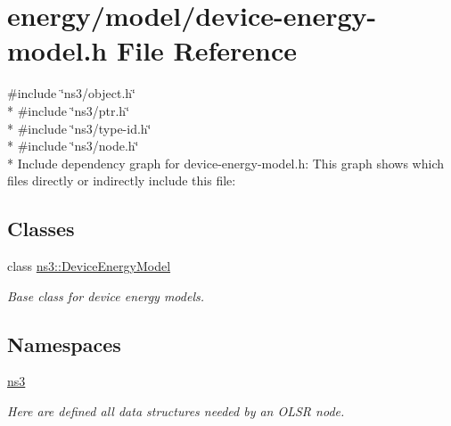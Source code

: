 \hypertarget{device-energy-model_8h}{}\section{energy/model/device-\/energy-\/model.h File Reference}
\label{device-energy-model_8h}
{\ttfamily \#include \char`\"{}ns3/object.\+h\char`\"{}}\\*
{\ttfamily \#include \char`\"{}ns3/ptr.\+h\char`\"{}}\\*
{\ttfamily \#include \char`\"{}ns3/type-\/id.\+h\char`\"{}}\\*
{\ttfamily \#include \char`\"{}ns3/node.\+h\char`\"{}}\\*
Include dependency graph for device-\/energy-\/model.h\+:
This graph shows which files directly or indirectly include this file\+:
\subsection*{Classes}
\begin{DoxyCompactItemize}
\item 
class \hyperlink{classns3_1_1DeviceEnergyModel}{ns3\+::\+Device\+Energy\+Model}
\begin{DoxyCompactList}\small\item\em Base class for device energy models. \end{DoxyCompactList}\end{DoxyCompactItemize}
\subsection*{Namespaces}
\begin{DoxyCompactItemize}
\item 
 \hyperlink{namespacens3}{ns3}
\begin{DoxyCompactList}\small\item\em Here are defined all data structures needed by an O\+L\+SR node. \end{DoxyCompactList}\end{DoxyCompactItemize}
